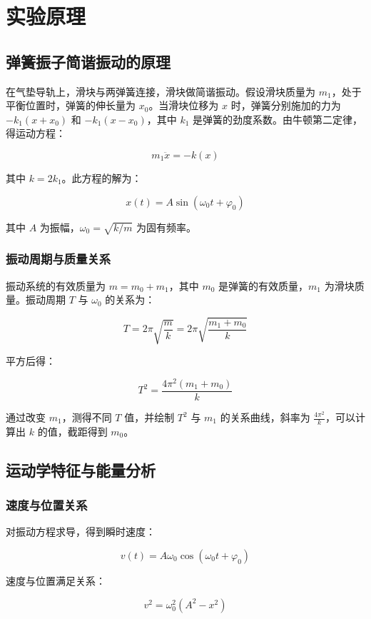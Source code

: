 \documentclass[zihao=5, UTF8]{article}
\theoremstyle{MyLineTheoremStyle} %
\theoremstyle{MyBlockTheoremStyle} %
\theoremstyle{MySubsubsectionStyle} %
\begin{document}
\section{实验原理}

\subsection{弹簧振子简谐振动的原理}

在气垫导轨上，滑块与两弹簧连接，滑块做简谐振动。假设滑块质量为 $m_1$，处于平衡位置时，弹簧的伸长量为 $x_0$。当滑块位移为 $x$ 时，弹簧分别施加的力为 $-k_1(x + x_0)$ 和 $-k_1(x - x_0)$，其中 $k_1$ 是弹簧的劲度系数。由牛顿第二定律，得运动方程：

\[
m_1 \ddot{x} = -k(x)
\]

其中 $k = 2k_1$。此方程的解为：

\[
x(t) = A \sin(\omega_0 t + \varphi_0)
\]

其中 $A$ 为振幅，$\omega_0 = \sqrt{k/m}$ 为固有频率。

\subsubsection{振动周期与质量关系}

振动系统的有效质量为 $m = m_0 + m_1$，其中 $m_0$ 是弹簧的有效质量，$m_1$ 为滑块质量。振动周期 $T$ 与 $\omega_0$ 的关系为：

\[
T = 2\pi \sqrt{\frac{m}{k}} = 2\pi \sqrt{\frac{m_1 + m_0}{k}}
\]

平方后得：

\[
T^2 = \frac{4\pi^2 (m_1 + m_0)}{k}
\]

通过改变 $m_1$，测得不同 $T$ 值，并绘制 $T^2$ 与 $m_1$ 的关系曲线，斜率为 $\frac{4\pi^2}{k}$，可以计算出 $k$ 的值，截距得到 $m_0$。

\subsection{运动学特征与能量分析}

\subsubsection{速度与位置关系}

对振动方程求导，得到瞬时速度：

\[
v(t) = A \omega_0 \cos(\omega_0 t + \varphi_0)
\]

速度与位置满足关系：

\[
v^2 = \omega_0^2 (A^2 - x^2)
\]
\end{document}
